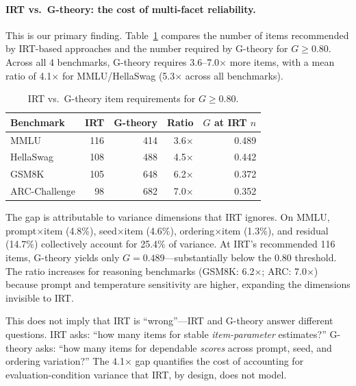 \documentclass[11pt,letterpaper]{article}
\begin{document}
\paragraph{IRT vs.\ G-theory: the cost of multi-facet reliability.}

This is our primary finding.
Table~\ref{tab:irt_vs_gtheory} compares the number of items recommended by IRT-based approaches and the number required by G-theory for $G \geq 0.80$.
Across all 4 benchmarks, G-theory requires 3.6--7.0$\times$ more items, with a mean ratio of 4.1$\times$ for MMLU/HellaSwag (5.3$\times$ across all benchmarks).

\begin{table}[t]
\centering
\caption{IRT vs.\ G-theory item requirements for $G \geq 0.80$.}
\label{tab:irt_vs_gtheory}
\small
\begin{tabular}{@{}lrrrr@{}}
\toprule
Benchmark & IRT & G-theory & Ratio & $G$ at IRT $n$ \\
\midrule
MMLU & 116 & 414 & 3.6$\times$ & 0.489 \\
HellaSwag & 108 & 488 & 4.5$\times$ & 0.442 \\
GSM8K & 105 & 648 & 6.2$\times$ & 0.372 \\
ARC-Challenge & 98 & 682 & 7.0$\times$ & 0.352 \\
\bottomrule
\end{tabular}
\end{table}

The gap is attributable to variance dimensions that IRT ignores.
On MMLU, prompt$\times$item (4.8\%), seed$\times$item (4.6\%), ordering$\times$item (1.3\%), and residual (14.7\%) collectively account for 25.4\% of variance.
At IRT's recommended 116 items, G-theory yields only $G = 0.489$---substantially below the 0.80 threshold.
The ratio increases for reasoning benchmarks (GSM8K: 6.2$\times$; ARC: 7.0$\times$) because prompt and temperature sensitivity are higher, expanding the dimensions invisible to IRT.

This does not imply that IRT is ``wrong''---IRT and G-theory answer different questions.
IRT asks: ``how many items for stable \emph{item-parameter} estimates?''
G-theory asks: ``how many items for dependable \emph{scores} across prompt, seed, and ordering variation?''
The 4.1$\times$ gap quantifies the cost of accounting for evaluation-condition variance that IRT, by design, does not model.
\end{document}

